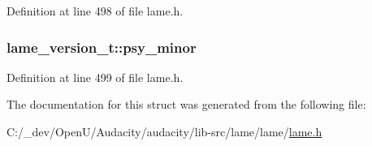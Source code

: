 Definition at line 498 of file lame.\+h.

\subsubsection[{\texorpdfstring{psy\+\_\+minor}{psy_minor}}]{ lame\+\_\+version\+\_\+t\+::psy\+\_\+minor}\hypertarget{structlame__version__t_a68bfe550749346b807489ec25ca038b5}{}\label{structlame__version__t_a68bfe550749346b807489ec25ca038b5}


Definition at line 499 of file lame.\+h.



The documentation for this struct was generated from the following file\+:\begin{DoxyCompactItemize}
\item 
C\+:/\+\_\+dev/\+Open\+U/\+Audacity/audacity/lib-\/src/lame/lame/\hyperlink{lame_8h}{lame.\+h}\end{DoxyCompactItemize}
